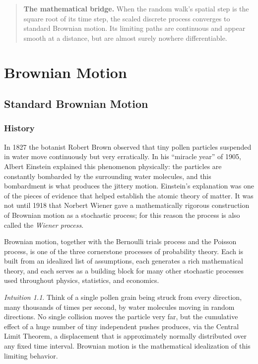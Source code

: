 \documentclass[12pt,openany]{book}
\theoremstyle{definition}
\theoremstyle{remark}
\newtheorem{intuition}[theorem]{Intuition}
\begin{document}
\begin{quote}
\colorbox{diagramGreen!10}{%
\parbox{\dimexpr\linewidth-2\fboxsep\relax}{%
\textbf{The mathematical bridge.} When the random walk's spatial step is the
square root of its time step, the scaled discrete process converges to
standard Brownian motion. Its limiting paths are continuous and appear
smooth at a distance, but are almost surely nowhere differentiable.}}
\end{quote}

\chapter{Brownian Motion}

\section{Standard Brownian Motion}
 
\subsection{History}
 
In 1827 the botanist Robert Brown observed that tiny pollen particles suspended in water move continuously but very erratically. In his ``miracle year'' of 1905, Albert Einstein explained this phenomenon physically: the particles are constantly bombarded by the surrounding water molecules, and this bombardment is what produces the jittery motion. Einstein's explanation was one of the pieces of evidence that helped establish the atomic theory of matter. It was not until 1918 that Norbert Wiener gave a mathematically rigorous construction of Brownian motion as a stochastic process; for this reason the process is also called the \emph{Wiener process}.
 
Brownian motion, together with the Bernoulli trials process and the Poisson process, is one of the three cornerstone processes of probability theory. Each is built from an idealized list of assumptions, each generates a rich mathematical theory, and each serves as a building block for many other stochastic processes used throughout physics, statistics, and economics.
 
\begin{intuition}
Think of a single pollen grain being struck from every direction, many thousands of times per second, by water molecules moving in random directions. No single collision moves the particle very far, but the cumulative effect of a huge number of tiny independent pushes produces, via the Central Limit Theorem, a displacement that is approximately normally distributed over any fixed time interval. Brownian motion is the mathematical idealization of this limiting behavior.
\end{intuition}
 
\end{document}
